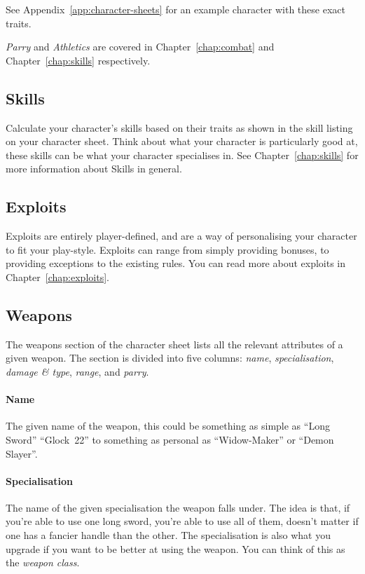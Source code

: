 See Appendix~\ref{app:character-sheets} for an example character with these exact traits.

\note \textit{Parry} and \textit{Athletics} are covered in Chapter~\ref{chap:combat} and Chapter~\ref{chap:skills} respectively.

\subsection{Skills}
Calculate your character's skills based on their traits as shown in the skill listing on your character sheet.
Think about what your character is particularly good at, these skills can be what your character specialises in.
See Chapter~\ref{chap:skills} for more information about Skills in general.

\subsection{Exploits}
Exploits are entirely player-defined, and are a way of personalising your character to fit your play-style.
Exploits can range from simply providing bonuses, to providing exceptions to the existing rules.
You can read more about exploits in Chapter~\ref{chap:exploits}.

\subsection{Weapons}
The weapons section of the character sheet lists all the relevant attributes of a given weapon.
The section is divided into five columns: \textit{name}, \textit{specialisation}, \textit{damage \& type}, \textit{range}, and \textit{parry}.

\paragraph{Name} The given name of the weapon, this could be something as simple as ``Long Sword'' ``Glock~22'' to something as personal as ``Widow-Maker'' or ``Demon Slayer''.

\paragraph{Specialisation} The name of the given specialisation the weapon falls under.
The idea is that, if you're able to use one long sword, you're able to use all of them, doesn't matter if one has a fancier handle than the other. 
The specialisation is also what you upgrade if you want to be better at using the weapon.
You can think of this as the \textit{weapon class}.

